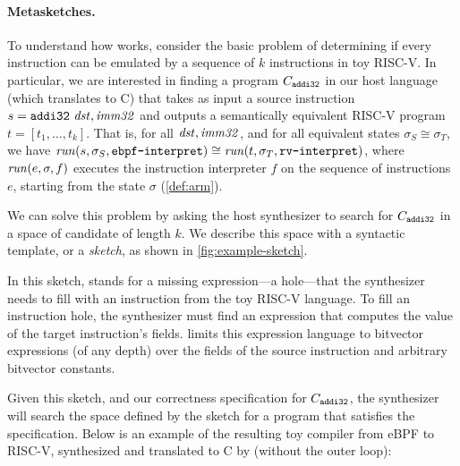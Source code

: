 \paragraph{Metasketches.} 

To understand how \jitsynth works, consider the basic problem of determining if
every  instruction can be emulated by a sequence of $k$ instructions
in toy RISC-V\@. In particular, we are interested in finding a program
$C_{\texttt{addi32}}$ in our host language (which \jitsynth translates to C) that
takes as input a source instruction $s = \texttt{addi32}\ \mathit{dst}, \mathit{imm32}$ and
outputs a semantically equivalent RISC-V program $t = [t_1,\ldots,t_k]$. That
is, for all $\mathit{dst}, \mathit{imm32}$, and for all equivalent states $\sigma_S \cong
\sigma_T$, we have $\mathit{run}(s, \sigma_S,
\texttt{ebpf-interpret})\cong\mathit{run}(t, \sigma_T, \texttt{rv-interpret})$, where
$\mathit{run}(e, \sigma, f)$ executes the instruction interpreter $f$ on the
sequence of instructions $e$, starting from the state $\sigma$
(\autoref{def:arm}).\tighten

We can solve this problem by asking the host synthesizer to search for
$C_{\texttt{addi32}}$ in a space of candidate \minicompilers of length $k$. We
describe this space with a syntactic template, or a \emph{sketch}, as shown in \autoref{fig:example-sketch}.

In this sketch,  stands for a missing expression---a hole---that the
synthesizer needs to fill with an instruction from the toy RISC-V language. To
fill an instruction hole, the synthesizer must find an expression that computes
the value of the target instruction's fields. \jitsynth limits this expression
language to bitvector expressions (of any depth) over the fields of the source
instruction and arbitrary bitvector constants.\tighten

Given this sketch, and our correctness specification for $C_{\texttt{addi32}}$, the
synthesizer will search the space defined by the sketch for a program that
satisfies the specification.
%
Below is an example of the resulting toy compiler from eBPF to
RISC-V, synthesized and translated to C by \jitsynth (without the
outer loop):\tighten

\begin{minipage}{\linewidth}
\end{minipage}

